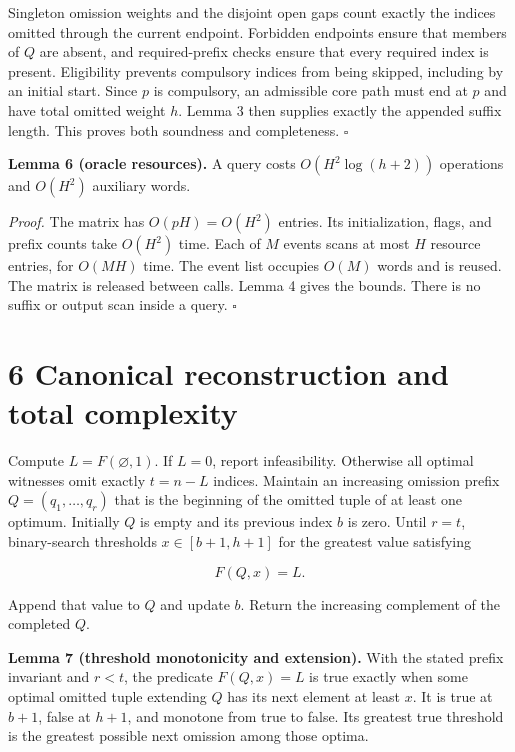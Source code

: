 \documentclass[
  11pt,
  letterpaper,
]{article}
\begin{document}
Singleton omission weights and the disjoint open gaps count exactly the
indices omitted through the current endpoint. Forbidden endpoints ensure
that members of \(Q\) are absent, and required-prefix checks ensure that
every required index is present. Eligibility prevents compulsory indices
from being skipped, including by an initial start. Since \(p\) is
compulsory, an admissible core path must end at \(p\) and have total
omitted weight \(h\). Lemma 3 then supplies exactly the appended suffix
length. This proves both soundness and completeness. \(\square\)

\textbf{Lemma 6 (oracle resources).} A query costs \(O(H^2\log(h+2))\)
operations and \(O(H^2)\) auxiliary words.

\emph{Proof.} The matrix has \(O(pH)=O(H^2)\) entries. Its
initialization, flags, and prefix counts take \(O(H^2)\) time. Each of
\(M\) events scans at most \(H\) resource entries, for \(O(MH)\) time.
The event list occupies \(O(M)\) words and is reused. The matrix is
released between calls. Lemma 4 gives the bounds. There is no suffix or
output scan inside a query. \(\square\)

\hypertarget{canonical-reconstruction-and-total-complexity}{%
\section{6 Canonical reconstruction and total
complexity}\label{canonical-reconstruction-and-total-complexity}}

Compute \(L=F(\varnothing,1)\). If \(L=0\), report infeasibility.
Otherwise all optimal witnesses omit exactly \(t=n-L\) indices. Maintain
an increasing omission prefix \(Q=(q_1,\ldots,q_r)\) that is the
beginning of the omitted tuple of at least one optimum. Initially \(Q\)
is empty and its previous index \(b\) is zero. Until \(r=t\),
binary-search thresholds \(x\in[b+1,h+1]\) for the greatest value
satisfying

\[F(Q,x)=L.\]

Append that value to \(Q\) and update \(b\). Return the increasing
complement of the completed \(Q\).

\textbf{Lemma 7 (threshold monotonicity and extension).} With the stated
prefix invariant and \(r<t\), the predicate \(F(Q,x)=L\) is true exactly
when some optimal omitted tuple extending \(Q\) has its next element at
least \(x\). It is true at \(b+1\), false at \(h+1\), and monotone from
true to false. Its greatest true threshold is the greatest possible next
omission among those optima.
\end{document}
